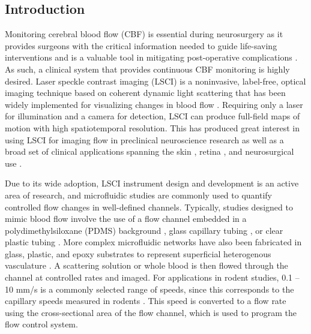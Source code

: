 \documentclass[12pt]{spieman}
\begin{document}
\begin{spacing}{2}


\section{Introduction}
\label{sect:introduction}

Monitoring cerebral blood flow (CBF) is essential during neurosurgery as it provides surgeons with the critical information needed to guide life-saving interventions and is a valuable tool in mitigating post-operative complications \cite{Kirkness.2005}. As such, a clinical system that provides continuous CBF monitoring is highly desired. Laser speckle contrast imaging (LSCI) is a noninvasive, label-free, optical imaging technique based on coherent dynamic light scattering that has been widely implemented for visualizing changes in blood flow \cite{Briers:2001hy,Boas:2010vr}. Requiring only a laser for illumination and a camera for detection, LSCI can produce full-field maps of motion with high spatiotemporal resolution. This has produced great interest in using LSCI for imaging flow in preclinical neuroscience research \cite{Dunn:2001dj,Ayata:2004ba,Bolay:2002jg,Durduran.2004} as well as a broad set of clinical applications spanning the skin \cite{Briers:1996kfa,Choi:2004jn}, retina \cite{Briers.1982,Srienc.2010}, and neurosurgical use \cite{Hecht:2009gu,Parthasarathy:2010gh,Klijn:2012ls}.

Due to its wide adoption, LSCI instrument design and development is an active area of research, and microfluidic studies are commonly used to quantify controlled flow changes in well-defined channels. Typically, studies designed to mimic blood flow involve the use of a flow channel embedded in a polydimethylsiloxane (PDMS) background \cite{Parthasarathy:2008el}, glass capillary tubing \cite{Choi:2004jn}, or clear plastic tubing \cite{Miao:2014}. More complex microfluidic networks have also been fabricated in glass, plastic, and epoxy substrates to represent superficial heterogenous vasculature \cite{Luu.2012}. A scattering solution \cite{Parthasarathy:2008el} or whole blood\cite{Choi:2004jn,Miao:2014} is then flowed through the channel at controlled rates and imaged. For applications in rodent studies, 0.1 -- 10 mm/s is a commonly selected range of speeds, since this corresponds to the capillary speeds measured in rodents \cite{Tomita:2008do}. This speed is converted to a flow rate using the cross-sectional area of the flow channel, which is used to program the flow control system.


\end{spacing}
\end{document}
